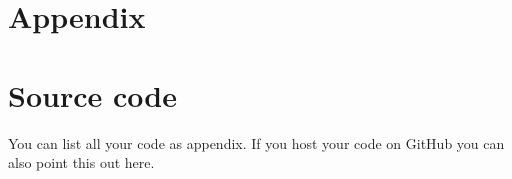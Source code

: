 \begin{appendices}
\section*{Appendix}
\section{Source code}
You can list all your code as appendix.  If you host your code on GitHub you
can also point this out here.

\end{appendices}

